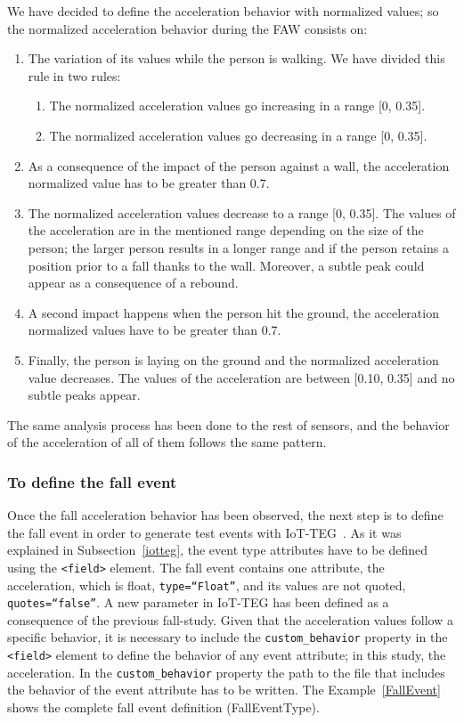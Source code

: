 \documentclass[10pt,journal,compsoc]{IEEEtran}
\begin{document}
We have decided to define the acceleration behavior with normalized values; so the normalized acceleration behavior during the FAW consists on:
\begin{enumerate}
	\item The variation of its values while the person is walking. We have divided this rule in two rules:
	\begin{enumerate}
		\item The normalized acceleration values go increasing in a range [0, 0.35].
		\item The normalized acceleration values go decreasing in a range [0, 0.35].
	\end{enumerate}
	\item As a consequence of the impact of the person against a wall, the acceleration normalized value has to be greater than 0.7.
	\item The normalized acceleration values decrease to a range [0, 0.35]. The values of the acceleration are in the mentioned range depending on the size of the person; the larger person results in a longer range and if the person retains a position prior to a fall thanks to the wall. Moreover, a subtle peak could appear as a consequence of a rebound.
	\item A second impact happens when the person hit the ground, the acceleration normalized values have to be greater than 0.7.
	\item Finally, the person is laying on the ground and the normalized acceleration value decreases. The values of the acceleration are between [0.10, 0.35] and no subtle peaks appear. 
\end{enumerate}
The same analysis process has been done to the rest of sensors, and the behavior of the acceleration of all of them follows the same pattern.

\subsubsection{To define the fall event} Once the fall acceleration behavior has been observed, the next step is to define the 
fall event in order to generate test events with IoT-TEG~\cite{TesisGutierrez2017,Gutierrez2017}. As it was explained in 
Subsection~\ref{iotteg}, the event type attributes have
to be defined using the \texttt{<field>} element. The fall event contains one attribute, the acceleration, which is float, 
\texttt{type=``Float''}, and its values are not quoted, \texttt{quotes=``false''}. A new parameter in IoT-TEG has been defined as a 
consequence of the previous fall-study. Given that the acceleration values follow a specific behavior, it is necessary to include 
the \texttt{custom\_behavior} property in the \texttt{<field>} element to define the behavior of any event attribute; 
in this study, the acceleration. In the \texttt{custom\_behavior} property the path to the file that includes the behavior of the 
event attribute has to be written. The Example~\ref{FallEvent} shows the complete fall event definition (FallEventType).
\end{document}
